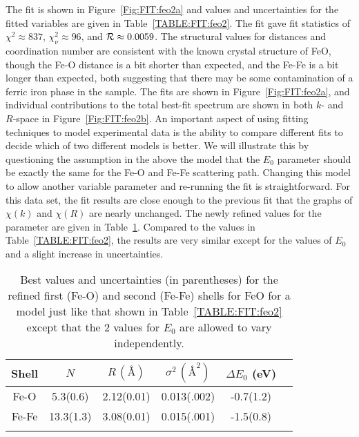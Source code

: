 The fit is shown in Figure~\ref{Fig:FIT:feo2a} and values and uncertainties
for the fitted variables are given in Table~\ref{TABLE:FIT:feo2}.  The fit
gave fit statistics of $\chi^2 \approx 837$, $\chi^2_\nu \approx 96$, and
${\cal{R}} \approx 0.0059$.  The structural values for distances and
coordination number are consistent with the known crystal structure of FeO,
though the Fe-O distance is a bit shorter than expected, and the Fe-Fe is a
bit longer than expected, both suggesting that there may be some
contamination of a ferric iron phase in the sample.  The fits are shown in
Figure~\ref{Fig:FIT:feo2a}, and individual contributions to the total best-fit
spectrum are shown in both $k$- and $R$-space in Figure~\ref{Fig:FIT:feo2b}.
An important aspect of using fitting techniques to model experimental data
is the ability to compare different fits to decide which of two different
models is better.  We will illustrate this by questioning the assumption in
the above the model that the $E_0$ parameter should be exactly the same for
the Fe-O and Fe-Fe scattering path.  Changing this model to allow another
variable parameter and re-running the fit is straightforward.  For this
data set, the fit results are close enough to the previous fit that the
graphs of $\chi(k)$ and $\chi(R)$ are nearly unchanged.  The newly refined
values for the parameter are given in Table~\ref{TABLE:FIT:feo3}.  Compared
to the values in Table~\ref{TABLE:FIT:feo2}, the results are very similar
except for the values of $E_0$ and a slight increase in uncertainties.

\begin{table}[tbh]
  \caption{Best values and uncertainties (in parentheses) for the
    refined first (Fe-O) and second (Fe-Fe) shells  for FeO for a model
    just like that shown in Table~\ref{TABLE:FIT:feo2} except that the 2
    values for $E_0$ are allowed to vary independently.}
  \label{TABLE:FIT:feo3}
  \begin{center}
    \begin{tabular}{cccccc}
    Shell & ${N}$ & ${R}\, (\text{\AA})$ & $\sigma^2\, (\text{\AA}^2)$ & ${\Delta E_0}$ (eV) \\
    \hline    \noalign{\smallskip}
    Fe-O   &   5.3(0.6)  &   2.12(0.01) & 0.013(.002) & -0.7(1.2)\\
    Fe-Fe  &  13.3(1.3) & 3.08(0.01) & 0.015(.001) &  -1.5(0.8)\\
    \noalign{\smallskip}
    \hline
  \end{tabular}
\end{center}
\end{table}



